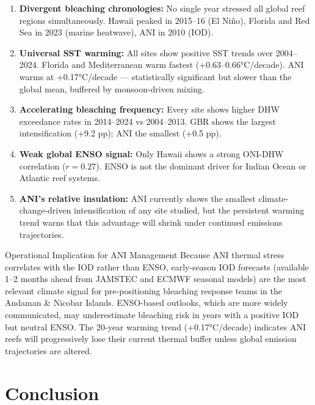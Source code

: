 \documentclass[12pt,a4paper]{report}
\begin{document}
\begin{enumerate}
  \item \textbf{Divergent bleaching chronologies:} No single year stressed all global reef regions simultaneously. Hawaii peaked in 2015--16 (El Niño), Florida and Red Sea in 2023 (marine heatwave), ANI in 2010 (IOD).
  \item \textbf{Universal SST warming:} All sites show positive SST trends over 2004--2024. Florida and Mediterranean warm fastest (+0.63--0.66°C/decade). ANI warms at +0.17°C/decade — statistically significant but slower than the global mean, buffered by monsoon-driven mixing.
  \item \textbf{Accelerating bleaching frequency:} Every site shows higher DHW exceedance rates in 2014--2024 vs 2004--2013. GBR shows the largest intensification (+9.2 pp); ANI the smallest (+0.5 pp).
  \item \textbf{Weak global ENSO signal:} Only Hawaii shows a strong ONI-DHW correlation ($r = 0.27$). ENSO is not the dominant driver for Indian Ocean or Atlantic reef systems.
  \item \textbf{ANI's relative insulation:} ANI currently shows the smallest climate-change-driven intensification of any site studied, but the persistent warming trend warns that this advantage will shrink under continued emissions trajectories.
\end{enumerate}

\begin{findingbox}{Operational Implication for ANI Management}
Because ANI thermal stress correlates with the IOD rather than ENSO, early-season IOD forecasts (available 1--2 months ahead from JAMSTEC and ECMWF seasonal models) are the most relevant climate signal for pre-positioning bleaching response teams in the Andaman \& Nicobar Islands.
ENSO-based outlooks, which are more widely communicated, may underestimate bleaching risk in years with a positive IOD but neutral ENSO.
The 20-year warming trend (+0.17°C/decade) indicates ANI reefs will progressively lose their current thermal buffer unless global emission trajectories are altered.
\end{findingbox}


\chapter{Conclusion}
\label{chap:conclusion}
\end{document}
